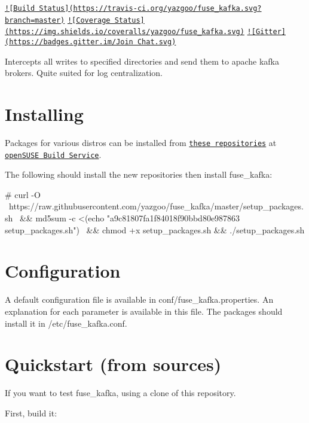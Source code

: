 \href{https://travis-ci.org/yazgoo/fuse_kafka}{\tt !\mbox{[}Build Status\mbox{]}(https\-://travis-\/ci.\-org/yazgoo/fuse\-\_\-kafka.\-svg?branch=master)} \href{https://coveralls.io/r/yazgoo/fuse_kafka?branch=master}{\tt !\mbox{[}Coverage Status\mbox{]}(https\-://img.\-shields.\-io/coveralls/yazgoo/fuse\-\_\-kafka.\-svg)} \href{https://gitter.im/yazgoo/fuse_kafka?utm_source=badge&utm_medium=badge&utm_campaign=pr-badge&utm_content=badge}{\tt !\mbox{[}Gitter\mbox{]}(https\-://badges.\-gitter.\-im/\-Join Chat.\-svg)}



Intercepts all writes to specified directories and send them to apache kafka brokers. Quite suited for log centralization.

\section*{Installing }

Packages for various distros can be installed from \href{http://download.opensuse.org/repositories/home:/yazgoo/}{\tt these repositories} at \href{https://build.opensuse.org/package/show/home:yazgoo/fuse_kafka}{\tt open\-S\-U\-S\-E Build Service}.

The following should install the new repositories then install fuse\-\_\-kafka\-: \begin{DoxyVerb}# curl -O \
    https://raw.githubusercontent.com/yazgoo/fuse_kafka/master/setup_packages.sh \
    && md5sum -c <(echo "a9c81807fa1f84018f90bbd80e987863  setup_packages.sh") \
    && chmod +x setup_packages.sh && ./setup_packages.sh
\end{DoxyVerb}


\section*{Configuration }

A default configuration file is available in conf/fuse\-\_\-kafka.\-properties. An explanation for each parameter is available in this file. The packages should install it in /etc/fuse\-\_\-kafka.conf.

\section*{Quickstart (from sources) }

If you want to test fuse\-\_\-kafka, using a clone of this repository.

First, build it\-: 


